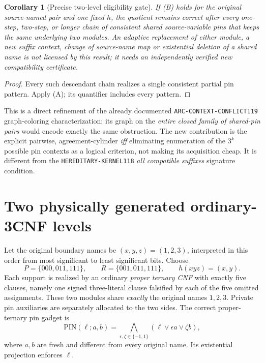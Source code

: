 \documentclass[11pt]{article}
\newtheorem{corollary}[theorem]{Corollary}
\begin{document}
\begin{corollary}[Precise two-level eligibility gate]
If (B) holds for the original source-named pair and one \emph{fixed}
$h$, the quotient remains correct after every one-step, two-step,
or longer chain of \emph{consistent shared source-variable pins}
that keeps the same underlying two modules. An adaptive replacement
of either module, a new suffix context, change of source-name map
or existential deletion of a shared name is \emph{not} licensed by
this result; it needs an independently verified new compatibility
certificate.
\end{corollary}
\begin{proof}
Every such descendant chain realizes a single consistent partial
pin pattern. Apply (A); its quantifier includes every pattern.
\end{proof}

This is a direct refinement of the already documented
\texttt{ARC-CONTEXT-CONFLICT119} graph-coloring characterization:
its graph on the \emph{entire closed family of shared-pin pairs}
would encode exactly the same obstruction. The new contribution
is the explicit pairwise, agreement-cylinder \emph{iff}
eliminating enumeration of the $3^k$ possible pin contexts
as a logical criterion, not making its acquisition cheap.
It is different from the \texttt{HEREDITARY-KERNEL118}
\emph{all compatible suffixes} signature condition.

\section{Two physically generated ordinary-3CNF levels}
Let the original boundary names be $(x,y,z)=(1,2,3)$, interpreted
in this order from most significant to least significant bits.
Choose
\[
 P=\{000,011,111\},\qquad
 R=\{001,011,111\},\qquad h(xyz)=(x,y).
\]
Each support is realized by an ordinary \emph{proper ternary CNF}
with exactly five clauses, namely one signed three-literal
clause falsified by each of the five omitted assignments.
These two modules share \emph{exactly} the original names $1,2,3$.
Private pin auxiliaries are separately allocated to the two sides.
The correct proper-ternary pin gadget is
\[
 \mathrm{PIN}(\ell;a,b)=
 \bigwedge_{\epsilon,\zeta\in\{-1,1\}}
 (\ell\vee\epsilon a\vee\zeta b),
\]
where $a,b$ are fresh and different from every original name.
Its existential projection enforces $\ell$.
\end{document}
